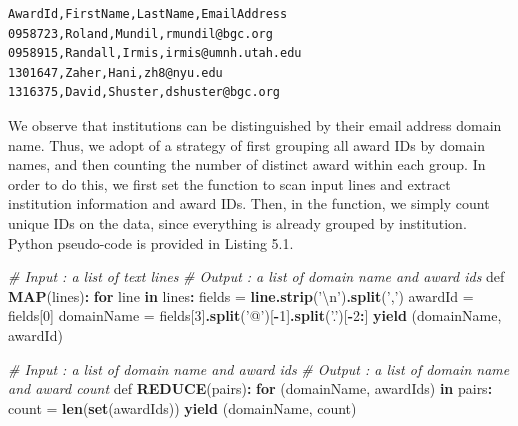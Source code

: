\documentclass[]{krantz}
\newenvironment{Shaded}{\begin{snugshade}}{\end{snugshade}}
\newcommand{\KeywordTok}[1]{\textcolor[rgb]{0.13,0.29,0.53}{\textbf{#1}}}
\newcommand{\DecValTok}[1]{\textcolor[rgb]{0.00,0.00,0.81}{#1}}
\newcommand{\CharTok}[1]{\textcolor[rgb]{0.31,0.60,0.02}{#1}}
\newcommand{\StringTok}[1]{\textcolor[rgb]{0.31,0.60,0.02}{#1}}
\newcommand{\CommentTok}[1]{\textcolor[rgb]{0.56,0.35,0.01}{\textit{#1}}}
\newcommand{\ControlFlowTok}[1]{\textcolor[rgb]{0.13,0.29,0.53}{\textbf{#1}}}
\newcommand{\OperatorTok}[1]{\textcolor[rgb]{0.81,0.36,0.00}{\textbf{#1}}}
\newcommand{\NormalTok}[1]{#1}
\begin{document}
\begin{verbatim}
AwardId,FirstName,LastName,EmailAddress
0958723,Roland,Mundil,rmundil@bgc.org
0958915,Randall,Irmis,irmis@umnh.utah.edu
1301647,Zaher,Hani,zh8@nyu.edu
1316375,David,Shuster,dshuster@bgc.org
\end{verbatim}

We observe that institutions can be distinguished by their email address
domain name. Thus, we adopt of a strategy of first grouping all award
IDs by domain names, and then counting the number of distinct award
within each group. In order to do this, we first set the function to
scan input lines and extract institution information and award IDs.
Then, in the function, we simply count unique IDs on the data, since
everything is already grouped by institution. Python pseudo-code is
provided in Listing 5.1.

\begin{Shaded}
\begin{Highlighting}[]
\CommentTok{# Input  : a list of text lines}
\CommentTok{# Output : a list of domain name and award ids}
\NormalTok{def }\KeywordTok{MAP}\NormalTok{(lines)}\OperatorTok{:}
\StringTok{    }\ControlFlowTok{for}\NormalTok{ line }\ControlFlowTok{in}\NormalTok{ lines}\OperatorTok{:}
\StringTok{        }\NormalTok{fields     =}\StringTok{ }\KeywordTok{line.strip}\NormalTok{(}\StringTok{'}\CharTok{\textbackslash{}n}\StringTok{'}\NormalTok{)}\KeywordTok{.split}\NormalTok{(}\StringTok{','}\NormalTok{)}
\NormalTok{        awardId    =}\StringTok{ }\NormalTok{fields[}\DecValTok{0}\NormalTok{]}
\NormalTok{        domainName =}\StringTok{ }\NormalTok{fields[}\DecValTok{3}\NormalTok{]}\KeywordTok{.split}\NormalTok{(}\StringTok{'@'}\NormalTok{)[}\OperatorTok{-}\DecValTok{1}\NormalTok{]}\KeywordTok{.split}\NormalTok{(}\StringTok{'.'}\NormalTok{)[}\OperatorTok{-}\DecValTok{2}\OperatorTok{:}\NormalTok{]}
        \KeywordTok{yield}\NormalTok{ (domainName, awardId)}

\CommentTok{# Input  : a list of domain name and award ids}
\CommentTok{# Output : a list of domain name and award count}
\NormalTok{def }\KeywordTok{REDUCE}\NormalTok{(pairs)}\OperatorTok{:}
\StringTok{    }\ControlFlowTok{for}\NormalTok{ (domainName, awardIds) }\ControlFlowTok{in}\NormalTok{ pairs}\OperatorTok{:}
\StringTok{        }\NormalTok{count =}\StringTok{ }\KeywordTok{len}\NormalTok{(}\KeywordTok{set}\NormalTok{(awardIds))}
        \KeywordTok{yield}\NormalTok{ (domainName, count)}
\end{Highlighting}
\end{Shaded}
\end{document}
